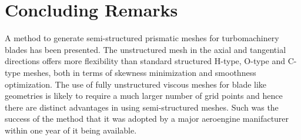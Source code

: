 \section{Concluding Remarks}
%
 A method to generate semi-structured prismatic meshes for turbomachinery
 blades has been presented. The unstructured mesh in the axial and
 tangential directions offers
 more flexibility than standard structured H-type, O-type and C-type meshes,
 both in terms of skewness minimization and smoothness optimization.
 The use of fully unstructured viscous meshes for blade like geometries
 is likely to require a much larger number of grid points and hence there
 are distinct advantages in using semi-structured meshes.
 Such was the success of the method that it was adopted by a major aeroengine
 manifacturer within one year of it being available.
